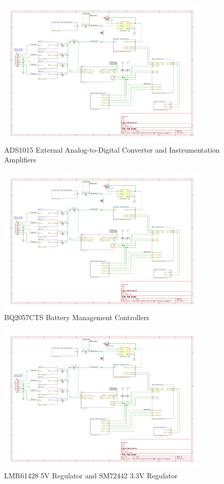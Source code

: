 \documentclass{article}
\numberwithin{figure}{section}
\numberwithin{equation}{section}
\begin{document}
{\begin{figure}[H]
	\centering
	\includegraphics[page=4,width=0.9\textwidth]{RFCxSchematics.pdf}
	\caption{ADS1015 External Analog-to-Digital Converter and Instrumentation Amplifiers}
	\label{fig:schemp4}
\end{figure}

\begin{figure}[H]
	\centering
	\includegraphics[page=5,width=0.9\textwidth]{RFCxSchematics.pdf}
	\caption{BQ2057CTS Battery Management Controllers}
	\label{fig:schemp5}
\end{figure}

\begin{figure}[H]
	\centering
	\includegraphics[page=6,width=0.9\textwidth]{RFCxSchematics.pdf}
	\caption{LMR61428 5V Regulator and SM72442 3.3V Regulator}
	\label{fig:schemp6}
\end{figure}

}
\end{document}
